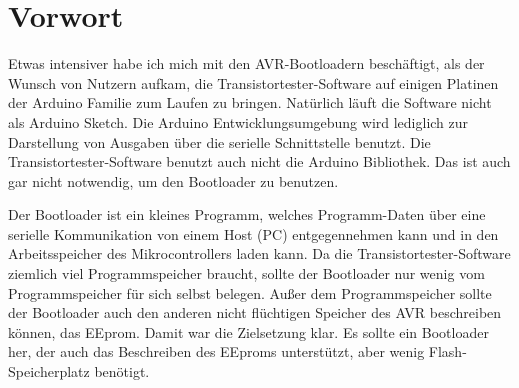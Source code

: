 \section*{Vorwort}

Etwas intensiver habe ich mich mit den AVR-Bootloadern beschäftigt,
als der Wunsch von Nutzern aufkam, die Transistortester-Software
auf einigen Platinen der Arduino Familie zum Laufen zu bringen.
Natürlich läuft die Software nicht als Arduino Sketch.
Die Arduino Entwicklungsumgebung wird lediglich zur Darstellung
von Ausgaben über die serielle Schnittstelle benutzt.
Die Transistortester-Software benutzt auch nicht die Arduino Bibliothek.
Das ist auch gar nicht notwendig, um den Bootloader zu benutzen.


Der Bootloader ist ein kleines Programm, welches Programm-Daten 
über eine serielle Kommunikation von einem Host (PC) entgegennehmen kann
und in den Arbeitsspeicher des Mikrocontrollers laden kann.
Da die Transistortester-Software ziemlich viel Programmspeicher
braucht, sollte der Bootloader nur wenig vom Programmspeicher für
sich selbst belegen.
Außer dem Programmspeicher sollte der Bootloader auch den anderen
nicht flüchtigen Speicher des AVR beschreiben können, das EEprom.
Damit war die Zielsetzung klar. Es sollte ein Bootloader her,
der auch das Beschreiben des EEproms unterstützt, aber wenig
Flash-Speicherplatz benötigt.


